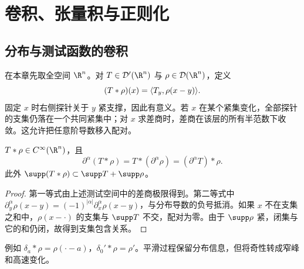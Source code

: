 \chapter{卷积、张量积与正则化}\label{ch:convolution}

\section{分布与测试函数的卷积}
在本章先取全空间 $\R^n$。对 $T\in\Dist(\R^n)$ 与 $\rho\in\Test(\R^n)$，定义
\begin{equation}\label{eq:convolution-function}
 (T*\rho)(x)=\langle T_y,\rho(x-y)\rangle.
\end{equation}
固定 $x$ 时右侧探针关于 $y$ 紧支撑，因此有意义。若 $x$ 在某个紧集变化，全部探针的支集仍落在一个共同紧集中；对 $x$ 求差商时，差商在该层的所有半范数下收敛。这允许把任意阶导数移入配对。
\begin{proposition}[卷积平滑性]\label{prop:smoothing}
$T*\rho\in C^\infty(\R^n)$，且
\[
 \partial^\alpha(T*\rho)=T*(\partial^\alpha\rho)
 =(\partial^\alpha T)*\rho.
\]
此外 $\supp(T*\rho)\subset\supp T+\supp\rho$。
\end{proposition}
\begin{proof}
第一等式由上述测试空间中的差商极限得到。第二等式中 $\partial_y^\alpha\rho(x-y)=(-1)^{|\alpha|}\partial_x^\alpha\rho(x-y)$，与分布导数的负号抵消。如果 $x$ 不在支集之和中，$\rho(x-\cdot)$ 的支集与 $\supp T$ 不交，配对为零。由于 $\supp\rho$ 紧，闭集与它的和仍闭，故得到支集包含关系。
\end{proof}
例如 $\delta_a*\rho=\rho(\cdot-a)$，$\delta_0'*\rho=\rho'$。平滑过程保留分布信息，但将奇性转成窄峰和高速变化。

